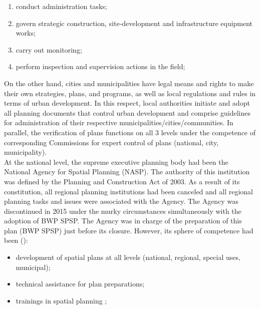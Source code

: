 \documentclass[11pt]{report}
\begin{document}
\begin{enumerate}
\item conduct administration tasks;
\item govern strategic construction, site-development and infrastructure equipment works;
\item carry out monitoring;
\item perform inspection and supervision actions in the field;
\end{enumerate} 

On the other hand, cities and municipalities have legal means and rights to make their own strategies, plans, and programs, as well as local regulations and rules in terms of urban development.
In this respect, local authorities initiate and adopt all planning documents that control urban development and comprise guidelines for administration of their respective municipalities/cities/communities. In parallel, the verification of plans functions on all 3 levels under the competence of corresponding Commissions for expert control of plans (national, city, municipality).
\\
At the national level, the supreme executive planning body had been the National Agency for Spatial Planning (NASP). The authority of this institution was defined by the Planning and Construction Act of 2003.
As a result of its constitution, all regional planning institutions had been canceled and all regional planning tasks and issues were associated with the Agency. 
The Agency was discontinued in 2015 under the murky circumstances simultaneously with the adoption of BWP SPSP. The Agency was in charge of the preparation of this plan (BWP SPSP) just before its closure.
However, its sphere of competence had been (\cite{Maksic 2012}):

\begin{itemize}
\item development of spatial plans at all levels (national, regional, special uses, municipal);
\item technical assistance for plan preparations;
\item trainings in spatial planning ;
\end{itemize}
\end{document}
